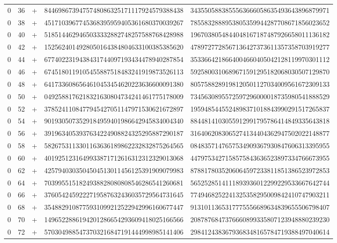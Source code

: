 \begin{longtable}{rrrll}
0 & 36 & + & 8446986739475748086325171117924579388438 & 3435505883855563666058635493643896879971 \\
0 & 38 & + & 4517103967745368395959405361680370039267 & 7855832888953805359944287708671856023652 \\
0 & 40 & + & 5185144629465033332882748257588768428988 & 1967038054844048167187487926658011136182 \\
0 & 42 & + & 1525624014928050164384804633100385385620 & 4789727728567136427373611357358703919277 \\
0 & 44 & + & 6774022319438431744097193434478940287854 & 3533664218664004660405042128119970301112 \\
0 & 46 & + & 6745180119105455887518483241919873526113 & 5925800310689671591295182068030507129870 \\
0 & 48 & + & 6417336086564610453454620223636600091380 & 8057588289198120501127034009561672309133 \\
0 & 50 & + & 0492588176218321630804734241461775178009 & 7345630895572597296000018735980541888529 \\
0 & 52 & + & 3785241108477945427051147971530621672897 & 1959485445524898371018843990291517265837 \\
0 & 54 & + & 9019305073529184959401986642945834004340 & 8844814103055912991795786414849335643818 \\
0 & 56 & + & 3919634053937634224908824325295887290187 & 3164062083065274134404362947502022148877 \\
0 & 58 & + & 5826753113301163636189862232832875264565 & 0848357147657534909367930847606313395955 \\
0 & 60 & + & 4019251231649933871712616312312329013068 & 4479753427158575843636523897334766673955 \\
0 & 62 & + & 4257940303504504513011456125391909079983 & 8788178035206064597233811851386523972853 \\
0 & 64 & + & 7039955151824938828080808546286541260681 & 5652528514111893936012299229533667642744 \\
0 & 66 & + & 3760542459222719587632436035729564731645 & 7749468252241325358295009842410747903211 \\
0 & 68 & + & 3548829108775931099212522942996160677447 & 9131011365317775556689634839655506798407 \\
0 & 70 & + & 1496522886194201286654293609418025166566 & 2087876847376660899335807123948880239230 \\
0 & 72 & + & 5703049885473703216847191444998985141406 & 2984124383679368348165784719388497040614 \\

\end{longtable}
